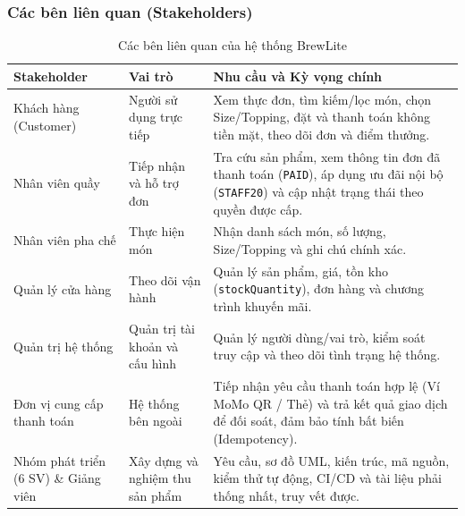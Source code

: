 \subsubsection{Các bên liên quan (Stakeholders)}
\begin{table}[H]
\centering
\small
\renewcommand{\arraystretch}{1.25}
\caption{Các bên liên quan của hệ thống BrewLite}
\begin{tabularx}{\textwidth}{|p{}|p{}|X|}
\hline
\textbf{Stakeholder} & \textbf{Vai trò} & \textbf{Nhu cầu và Kỳ vọng chính} \\
\hline
Khách hàng (Customer) & Người sử dụng trực tiếp & Xem thực đơn, tìm kiếm/lọc món, chọn Size/Topping, đặt và thanh toán không tiền mặt, theo dõi đơn và điểm thưởng. \\
\hline
Nhân viên quầy & Tiếp nhận và hỗ trợ đơn & Tra cứu sản phẩm, xem thông tin đơn đã thanh toán (\texttt{PAID}), áp dụng ưu đãi nội bộ (\texttt{STAFF20}) và cập nhật trạng thái theo quyền được cấp. \\
\hline
Nhân viên pha chế & Thực hiện món & Nhận danh sách món, số lượng, Size/Topping và ghi chú chính xác. \\
\hline
Quản lý cửa hàng & Theo dõi vận hành & Quản lý sản phẩm, giá, tồn kho (\texttt{stockQuantity}), đơn hàng và chương trình khuyến mãi. \\
\hline
Quản trị hệ thống & Quản trị tài khoản và cấu hình & Quản lý người dùng/vai trò, kiểm soát truy cập và theo dõi tình trạng hệ thống. \\
\hline
Đơn vị cung cấp thanh toán & Hệ thống bên ngoài & Tiếp nhận yêu cầu thanh toán hợp lệ (Ví MoMo QR / Thẻ) và trả kết quả giao dịch để đối soát, đảm bảo tính bất biến (Idempotency). \\
\hline
Nhóm phát triển (6 SV) \& Giảng viên & Xây dựng và nghiệm thu sản phẩm & Yêu cầu, sơ đồ UML, kiến trúc, mã nguồn, kiểm thử tự động, CI/CD và tài liệu phải thống nhất, truy vết được. \\
\hline
\end{tabularx}
\end{table}

